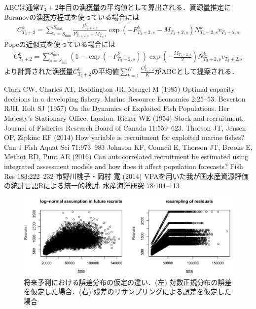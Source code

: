 \documentclass[11pt]{jsarticle}
\begin{document}
ABCは通常$T_{3}+2$年目の漁獲量の平均値として算出される．資源量推定にBaranovの漁獲方程式を使っている場合には
\begin{eqnarray}
  C_{T_3+2}^k=\sum_{s=S_{\mathrm{min}}}^{S_{\mathrm{max}}} \frac{F_{T_3+2,s}^k}{F_{T_3+2,s}^k+M_{T_4,s}}
  \exp(- F_{T_3+2,s}^k-M_{T_3+2,s}) N_{T_3+2,s}^k v_{T_3+2,s}
\end{eqnarray}
Popeの近似式を使っている場合には
\begin{eqnarray}
  C_{T_3+2}^k=\sum_{s=S_{\mathrm{min}}}^{S_{\mathrm{max}}} (1-\exp(- F_{T_3+2,s}^k)) \exp(-\frac{M_{T_3+2, s}}{2}) N_{T_3+2,s}^k v_{T_3+2,s} 
\end{eqnarray}
より計算された漁獲量$C_{T_3+2}^k$の平均値$\sum_{k=1}^K \frac{C_{T_3+2}^k}{K}$がABCとして提案される．

\begin{thebibliography}{9}
   Clark CW, Charles AT, Beddington JR, Mangel M (1985) Optimal capacity decisions in a developing fishery. Marine Resource Economics 2:25--53.
 Beverton RJH, Holt SJ (1957) On the Dynamics of Exploited Fish Populations. Her Majesty’s Stationary Office, London.
 Ricker WE (1954) Stock and recruitment. Journal of Fisheries Research Board of Canada 11:559--623.
 Thorson JT, Jensen OP, Zipkinc EF (2014) How variable is recruitment for exploited marine fishes? Can J Fish Aquat Sci 71:973--983
 Johnson KF, Council E, Thorson JT, Brooks E, Methot RD, Punt AE (2016) Can autocorrelated recruitment be estimated using integrated assessment models and how does it affect population forecasts? Fish Res 183:222--232
 市野川桃子・岡村 寛 (2014) VPAを用いた我が国水産資源評価の統計言語Rによる統一的検討. 水産海洋研究 78:104--113



\end{thebibliography}

\begin{figure}[h]
  \includegraphics[bb=0 0 600 300, width=13cm]{fig_resample.png}
  \caption{将来予測における誤差分布の仮定の違い．(左) 対数正規分布の誤差を仮定した場合．(右) 残差のリサンプリングによる誤差を仮定した場合}
  \label{fig_resample}
\end{figure}
\end{document}
